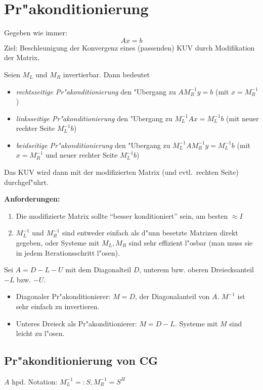  
\section{Pr"akonditionierung}

Gegeben wie immer:
\[
Ax = b
\]
Ziel: Beschleunigung der Konvergenz eines (passenden) KUV durch Modifikation der Matrix.

\begin{defn} Seien $M_L$ und $M_R$ invertierbar.
Dann bedeutet
\begin{itemize}
\item {\em rechtsseitige Pr"akonditionierung} den "Ubergang zu $AM_R^{-1}y = b$ (mit $x = M_R^{-1}$)
\item {\em linksseitige Pr"akonditionierung} den "Ubergang zu $M_L^{-1}Ax = M_L^{-1}b$ (mit neuer rechter Seite  $M_L^{-1}b$)
\item {\em beidseitige Pr"akonditionierung} den "Ubergang zu $M_L^{-1}AM_R^{-1}y = M_L^{-1}b$ (mit $x = M_R^{-1}$ und neuer rechter Seite  $M_L^{-1}b$)
\end{itemize}
\end{defn}

Das KUV wird dann mit der modifizierten Matrix (und evtl.\ rechten Seite) durchgef"uhrt.

\textbf{Anforderungen:}
\begin{enumerate}
   \item Die modifizierte Matrix sollte ``besser konditioniert'' sein, am besten $\approx I$
   \item $M_L^{-1}$ und $M_R^{-1}$ sind entweder einfach als d"unn besetzte Matrizen direkt gegeben, oder Systeme mit $M_L, M_R$ sind sehr effizient l"osbar (man muss sie in jedem Iterationsschritt l"osen).
\end{enumerate}

\begin{bsp}  Sei $A = D-L-U$ mit dem Diagonalteil $D$, unterem bzw. oberen Dreiecksanteil $-L$ bzw. $-U$.
\begin {itemize}
   \item Diagonaler Pr"akonditionierer: $M = D$, der Diagonalanteil von $A$. $M^{-1}$ ist sehr einfach zu invertieren.
   \item Unteres Dreieck als Pr"akonditionierer: $M = D-L$. Systeme mit $M$ sind leicht zu l"osen.
\end{itemize}
\end{bsp}



\subsection{Pr"akonditionierung von CG}
$A$ hpd. Notation: $M_L^{-1} =:S, M_R^{-1} = S^H$

